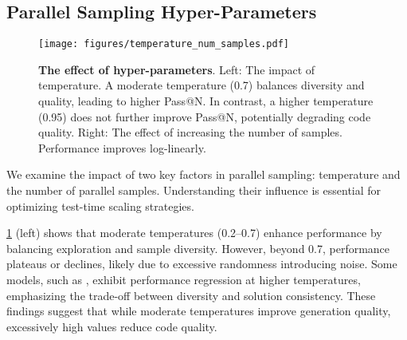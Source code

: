 \subsection{Parallel Sampling Hyper-Parameters}
\begin{figure}[h]
    \centering
    \texttt{[image: figures/temperature\_num\_samples.pdf]}
    \caption{\textbf{The effect of hyper-parameters}. Left: The impact of temperature. A moderate temperature (0.7) balances diversity and quality, leading to higher Pass@N. In contrast, a higher temperature (0.95) does not further improve Pass@N, potentially degrading code quality. Right: The effect of increasing the number of samples. Performance improves log-linearly.}
    \label{fig:exp_hyper_parameters}
\end{figure}
\label{ssect:ablation_parallel}

We examine the impact of two key factors in parallel sampling: temperature and the number of parallel samples. Understanding their influence is essential for optimizing test-time scaling strategies.

\cref{fig:exp_hyper_parameters} (left) shows that moderate temperatures (0.2–0.7) enhance performance by balancing exploration and sample diversity. However, beyond 0.7, performance plateaus or declines, likely due to excessive randomness introducing noise. Some models, such as \qwensevenb, exhibit performance regression at higher temperatures, emphasizing the trade-off between diversity and solution consistency. These findings suggest that while moderate temperatures improve generation quality, excessively high values reduce code quality.




